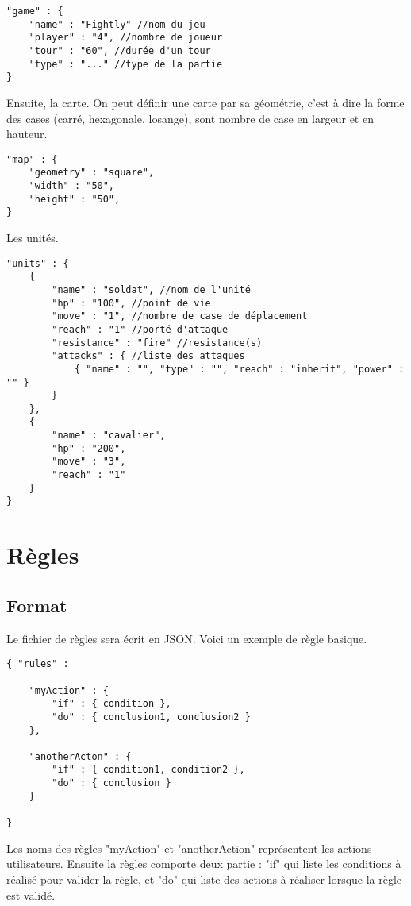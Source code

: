 \documentclass[10pt,a4paper]{article}
\begin{document}
\begin{verbatim}
"game" : {
	"name" : "Fightly" //nom du jeu
	"player" : "4", //nombre de joueur
	"tour" : "60", //durée d'un tour
	"type" : "..." //type de la partie
}
\end{verbatim}

Ensuite, la carte. On peut définir une carte par sa géométrie, c'est à dire la forme des cases (carré, hexagonale, losange), sont nombre de case en largeur et en hauteur.

\begin{verbatim}
"map" : {
	"geometry" : "square",
	"width" : "50",
	"height" : "50",
}
\end{verbatim}

Les unités.

\begin{verbatim}
"units" : {
	{
		"name" : "soldat", //nom de l'unité
		"hp" : "100", //point de vie
		"move" : "1", //nombre de case de déplacement
		"reach" : "1" //porté d'attaque
		"resistance" : "fire" //resistance(s)
		"attacks" : { //liste des attaques
			{ "name" : "", "type" : "", "reach" : "inherit", "power" : "" }
		}
	},
	{
		"name" : "cavalier",
		"hp" : "200",
		"move" : "3",
		"reach" : "1"
	}
}
\end{verbatim}




\section{Règles}

\subsection{Format}

Le fichier de règles sera écrit en JSON. Voici un exemple de règle basique.

\begin{verbatim}
{ "rules" :

	"myAction" : {
		"if" : { condition },
		"do" : { conclusion1, conclusion2 }
	},
	
	"anotherActon" : {
		"if" : { condition1, condition2 },
		"do" : { conclusion }
	}
	
}
\end{verbatim}

Les noms des règles "myAction" et "anotherAction" représentent les actions utilisateurs. Ensuite la règles comporte deux partie : "if" qui liste les conditions à réalisé pour valider la règle, et "do" qui liste des actions à réaliser lorsque la règle est validé.
\end{document}
